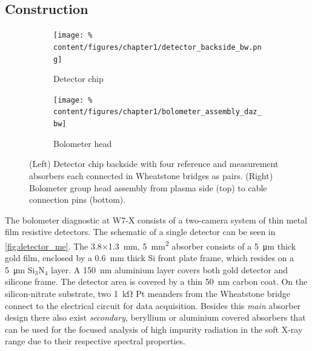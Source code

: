         \subsection{Construction}\label{subsec:construction}%
%
            \begin{figure}[t]%
                \centering%
                \begin{subfigure}{0.375\textwidth}%
                    \centering%
                    \texttt{[image: \%
                        content/figures/chapter1/detector\_backside\_bw.png]}%
                    \vspace*{0.25cm}%
                    \caption{Detector chip}\label{fig:chip}%
                \end{subfigure}%
                \hspace*{1.0cm}%
                \begin{subfigure}{0.33\textwidth}%
                    \centering%
                    \texttt{[image: \%
                        content/figures/chapter1/bolometer\_assembly\_daz\_bw]}%
                    \caption{Bolometer head}\label{fig:assembly}%
                \end{subfigure}%
                \caption{(Left) Detector chip backside with four reference and measurement absorbers each connected in Wheatstone bridges as pairs. (Right) Bolometer group head assembly from plasma side (top) to cable connection pins (bottom).}\label{fig:wheatstone_assembly}%
            \end{figure}%
%
            The bolometer diagnostic at W7-X consists of a two-camera system of thin metal film resistive detectors. The schematic of a single detector can be seen in \cref{fig:detector_me}. The 3.8$\times$\SI{1.3}{\milli\meter}, \SI{5}{\milli\meter\squared} absorber consists of a \mbox{\SI{5}{\micro\meter}} thick gold film, enclosed by a \mbox{\SI{0.6}{\milli\meter}} thick Si front plate frame, which resides on a \mbox{\SI{5}{\micro\meter}} Si$_{3}$N$_{4}$ layer. A \mbox{\SI{150}{\nano\meter}} aluminium layer covers both gold detector and silicone frame. The detector area is covered by a thin \mbox{\SI{50}{\nano\meter}} carbon coat. On the silicon-nitrate substrate, two \mbox{\SI{1}{\kilo\ohm}} Pt meanders from the Wheatstone bridge connect to the electrical circuit for data acquisition. Besides this \textit{main} absorber design there also exist \textit{secondary}, beryllium or aluminium covered absorbers that can be used for the focused analysis of high impurity radiation in the soft X-ray range due to their respective spectral properties.\\%
